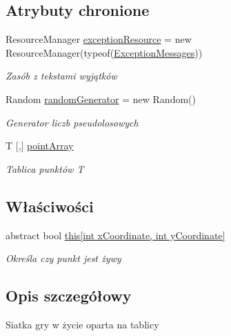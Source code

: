\subsection*{Atrybuty chronione}
\begin{DoxyCompactItemize}
\item 
Resource\+Manager \hyperlink{class_convay_1_1_core_1_1_array_grid_a5abe9f109182c5fa7754db9c0b1fc58f}{exception\+Resource} = new Resource\+Manager(typeof(\hyperlink{class_convay_1_1_core_1_1_exception_messages}{Exception\+Messages}))
\begin{DoxyCompactList}\small\item\em Zasób z tekstami wyjątków \end{DoxyCompactList}\item 
Random \hyperlink{class_convay_1_1_core_1_1_array_grid_ae591bc179fd709c4d73eeb899a973d19}{random\+Generator} = new Random()
\begin{DoxyCompactList}\small\item\em Generator liczb pseudolosowych \end{DoxyCompactList}\item 
T \mbox{[},\mbox{]} \hyperlink{class_convay_1_1_core_1_1_array_grid_a50b931a7262eb725149b6552d1921af4}{point\+Array}
\begin{DoxyCompactList}\small\item\em Tablica punktów T \end{DoxyCompactList}\end{DoxyCompactItemize}
\subsection*{Właściwości}
\begin{DoxyCompactItemize}
\item 
abstract bool \hyperlink{class_convay_1_1_core_1_1_array_grid_a5172309852f135d2cde364c609733000}{this\mbox{[}int x\+Coordinate, int y\+Coordinate\mbox{]}}
\begin{DoxyCompactList}\small\item\em Określa czy punkt jest żywy \end{DoxyCompactList}\end{DoxyCompactItemize}


\subsection{Opis szczegółowy}
Siatka gry w życie oparta na tablicy 


